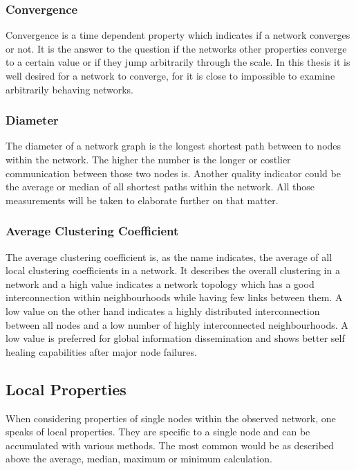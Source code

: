 \subsubsection{Convergence}
Convergence is a time dependent property which indicates if a network converges
or not. It is the answer to the question if the networks other properties
converge to a certain value or if they jump arbitrarily through the scale.
In this thesis it is well desired for a network to converge, for it is close to
impossible to examine arbitrarily behaving networks.

\subsubsection{Diameter}
The diameter of a network graph is the longest shortest path between to nodes
within the network. The higher the number is the longer or costlier
communication between those two nodes is. Another quality indicator could be the
average or median of all shortest paths within the network. All those
measurements will be taken to elaborate further on that matter.

\subsubsection{Average Clustering Coefficient}
The average clustering coefficient is, as the name indicates,  the average of
all local clustering coefficients in a network. It describes the overall
clustering in a network and a high value indicates a network topology which has
a good interconnection within neighbourhoods while having few links between them.
A low value on the other hand indicates a highly distributed interconnection
between all nodes and a low number of highly interconnected neighbourhoods. A low
value is preferred for global information dissemination and shows better self
healing capabilities after major node failures.
\subsection{Local Properties}
When considering properties of single nodes within the observed network, one
speaks of local properties. They are specific to a single node and can be
accumulated with various methods. The most common would be as described above
the average, median, maximum or minimum calculation. 
